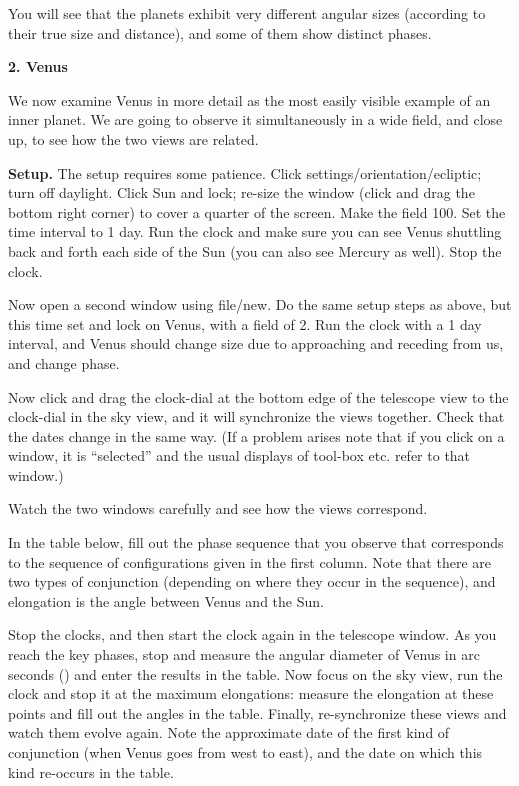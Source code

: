 \documentclass[12pt]{article}
\begin{document}
You will see that the planets exhibit very different angular sizes
(according to their true size and distance), and some of them show
distinct phases.

\medskip
\bigskip
\noindent
{\bf 2. Venus}

\medskip
\noindent
We now examine Venus in more detail as the most easily visible example of an inner
planet. We are going to observe it simultaneously in a wide field, and close
up, to see how the two views are related.

\medskip\noindent
{\bf Setup.} The setup requires some patience. Click
settings/orientation/ecliptic; turn off daylight. Click Sun and lock;
re-size the window (click and drag the bottom right corner) to cover a
quarter of the screen. Make the field 100\deg. Set the time interval
to 1 day. Run the clock and make sure you can see Venus shuttling back
and forth each side of the Sun (you can also see Mercury as
well). Stop the clock.

\medskip
\noindent Now open a second window using file/new. Do the same setup
steps as above, but this time set and lock on Venus, with a field of
2\arcmin. Run the clock with a 1 day interval, and Venus should change
size due to approaching and receding from us, and change phase.

\medskip
\noindent Now click and drag the clock-dial at the bottom edge of the
telescope view to the clock-dial in
the sky view, and it will synchronize the views together. Check that
the dates change in the same way.  (If a problem
arises note that if you click on a window, it is ``selected'' and the
usual displays of tool-box etc. refer to that window.)

\medskip
Watch the two windows  carefully and see how the views correspond.

\medskip
In the table below, fill out the phase sequence that you observe that
corresponds to the sequence of configurations given in the first
column. Note that there are two types of conjunction (depending on
where they occur in the sequence), and elongation is the angle between
Venus and the Sun.

Stop the clocks, and then start the clock again in the telescope
window. As you reach the key phases, stop and measure the angular
diameter of Venus in arc seconds (\arcsec) and enter the results in
the table. Now focus on the sky view, run the clock and stop it at the
maximum elongations: measure the elongation at these points and fill
out the angles in the table. Finally, re-synchronize these views and
watch them evolve again.  Note the approximate date of the first kind
of conjunction (when Venus goes from west to east), and the date on
which this kind re-occurs in the table.
\end{document}
